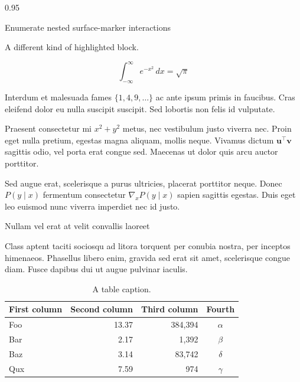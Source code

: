 \documentclass[final]{beamer}
\newlength{\colwidth}
\begin{document}
\begin{frame}[t]
\begin{columns}[t]
\begin{column}{0.95\colwidth}

  \begin{exampleblock}{Enumerate nested surface-marker interactions}

    A different kind of highlighted block.

    $$
    \int_{-\infty}^{\infty} e^{-x^2}\,dx = \sqrt{\pi}
    $$

    Interdum et malesuada fames $\{1, 4, 9, \ldots\}$ ac ante ipsum primis in
    faucibus. Cras eleifend dolor eu nulla suscipit suscipit. Sed lobortis non
    felis id vulputate.


    Praesent consectetur mi $x^2 + y^2$ metus, nec vestibulum justo viverra
    nec. Proin eget nulla pretium, egestas magna aliquam, mollis neque. Vivamus
    dictum $\mathbf{u}^\intercal\mathbf{v}$ sagittis odio, vel porta erat
    congue sed. Maecenas ut dolor quis arcu auctor porttitor.


    Sed augue erat, scelerisque a purus ultricies, placerat porttitor neque.
    Donec $P(y \mid x)$ fermentum consectetur $\nabla_x P(y \mid x)$ sapien
    sagittis egestas. Duis eget leo euismod nunc viverra imperdiet nec id
    justo.

  \end{exampleblock}

  \begin{block}{Nullam vel erat at velit convallis laoreet}

    Class aptent taciti sociosqu ad litora torquent per conubia nostra, per
    inceptos himenaeos. Phasellus libero enim, gravida sed erat sit amet,
    scelerisque congue diam. Fusce dapibus dui ut augue pulvinar iaculis.

    \begin{table}
      \centering
      \begin{tabular}{l r r c}
        \toprule
        \textbf{First column} & \textbf{Second column} & \textbf{Third column} & \textbf{Fourth} \\
        \midrule
        Foo & 13.37 & 384,394 & $\alpha$ \\
        Bar & 2.17 & 1,392 & $\beta$ \\
        Baz & 3.14 & 83,742 & $\delta$ \\
        Qux & 7.59 & 974 & $\gamma$ \\
        \bottomrule
      \end{tabular}
      \caption{A table caption.}
    \end{table}


\end{block}
\end{column}
\end{columns}
\end{frame}
\end{document}
